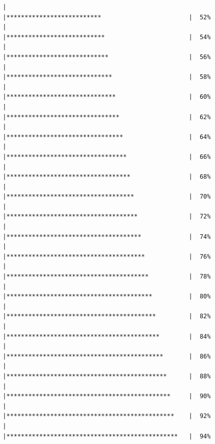\documentclass{article}\usepackage[]{graphicx}\usepackage[]{color}
\makeatletter
\newenvironment{kframe}{%
 \def\at@end@of@kframe{}%
 \ifinner\ifhmode%
  \def\at@end@of@kframe{\end{minipage}}%
  \begin{minipage}{\columnwidth}%
 \fi\fi%
 \def\FrameCommand##1{\hskip\@totalleftmargin \hskip-\fboxsep
 \colorbox{shadecolor}{##1}\hskip-\fboxsep
     \hskip-\linewidth \hskip-\@totalleftmargin \hskip\columnwidth}%
 \MakeFramed {\advance\hsize-\width
   \@totalleftmargin\z@ \linewidth\hsize
   \@setminipage}}%
 {\par\unskip\endMakeFramed%
 \at@end@of@kframe}
\newenvironment{knitrout}{}{} %
\makeatother
\begin{document}
\begin{knitrout}
\begin{kframe}
\begin{verbatim}
  |                                                        
  |**************************                        |  52%
  |                                                        
  |***************************                       |  54%
  |                                                        
  |****************************                      |  56%
  |                                                        
  |*****************************                     |  58%
  |                                                        
  |******************************                    |  60%
  |                                                        
  |*******************************                   |  62%
  |                                                        
  |********************************                  |  64%
  |                                                        
  |*********************************                 |  66%
  |                                                        
  |**********************************                |  68%
  |                                                        
  |***********************************               |  70%
  |                                                        
  |************************************              |  72%
  |                                                        
  |*************************************             |  74%
  |                                                        
  |**************************************            |  76%
  |                                                        
  |***************************************           |  78%
  |                                                        
  |****************************************          |  80%
  |                                                        
  |*****************************************         |  82%
  |                                                        
  |******************************************        |  84%
  |                                                        
  |*******************************************       |  86%
  |                                                        
  |********************************************      |  88%
  |                                                        
  |*********************************************     |  90%
  |                                                        
  |**********************************************    |  92%
  |                                                        
  |***********************************************   |  94%

\end{verbatim}
\end{kframe}
\end{knitrout}
\end{document}
